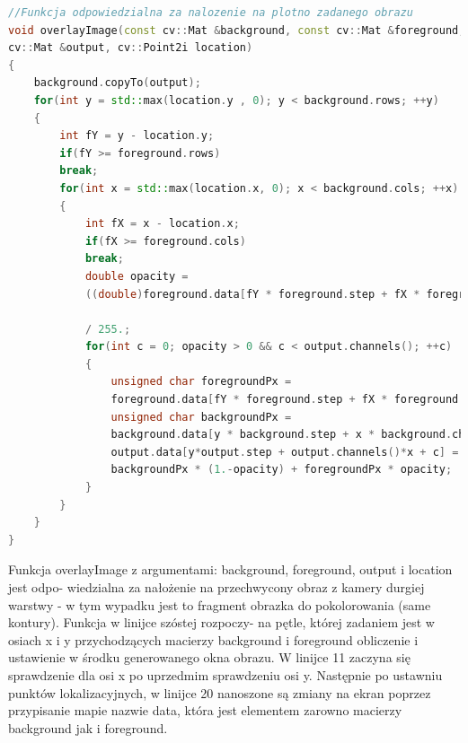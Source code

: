 \documentclass{article}
\begin{document}
\begin{lstlisting}[language=C++, caption=Nakładanie obrazu do kolorowania]
//Funkcja odpowiedzialna za nalozenie na plotno zadanego obrazu
void overlayImage(const cv::Mat &background, const cv::Mat &foreground, 
cv::Mat &output, cv::Point2i location)
{
	background.copyTo(output);
	for(int y = std::max(location.y , 0); y < background.rows; ++y)
	{
		int fY = y - location.y;
		if(fY >= foreground.rows)
		break;
		for(int x = std::max(location.x, 0); x < background.cols; ++x)
		{
			int fX = x - location.x;
			if(fX >= foreground.cols)
			break;
			double opacity =
			((double)foreground.data[fY * foreground.step + fX * foreground.channels() + 3])
			
			/ 255.;
			for(int c = 0; opacity > 0 && c < output.channels(); ++c)
			{
				unsigned char foregroundPx =
				foreground.data[fY * foreground.step + fX * foreground.channels() + c];
				unsigned char backgroundPx =
				background.data[y * background.step + x * background.channels() + c];
				output.data[y*output.step + output.channels()*x + c] =
				backgroundPx * (1.-opacity) + foregroundPx * opacity;
			}
		}
	}
}
\end{lstlisting}

Funkcja overlayImage z argumentami: background, foreground, output i location jest odpo- wiedzialna za nałożenie na przechwycony obraz z kamery durgiej warstwy - w tym wypadku jest to fragment obrazka do pokolorowania (same kontury).
Funkcja w linijce szóstej rozpoczy- na pętle, której zadaniem jest w osiach x i y przychodzących macierzy background i foreground obliczenie i ustawienie w środku generowanego okna obrazu. W linijce 11 zaczyna się sprawdzenie dla osi x po uprzedmim sprawdzeniu osi y. Następnie po ustawniu punktów lokalizacyjnych, w linijce 20 nanoszone są zmiany na ekran poprzez przypisanie mapie nazwie data, która jest elementem zarowno macierzy background jak i foreground.

\newpage




\renewcommand\lstlistlistingname{Fragmenty kodu}
\begin{lstlistoflistings}
\end{lstlistoflistings}
\end{document}
